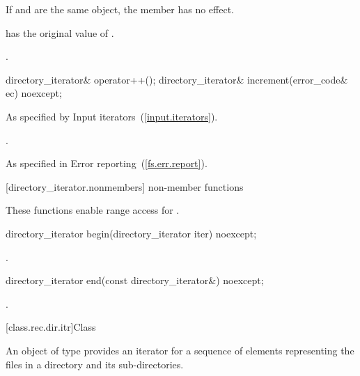 \begin{itemdescr}
\pnum
\effects If  and  are the same
  object, the member has no effect.

\pnum
\postconditions {} has the original value of .

\pnum
\returns {}.
\end{itemdescr}

\begin{itemdecl}
directory_iterator& operator++();
directory_iterator& increment(error_code& ec) noexcept;
\end{itemdecl}

\begin{itemdescr}

\pnum
\effects As specified by Input iterators~(\ref{input.iterators}).

\pnum
\returns {}.

\pnum
\throws As specified in Error reporting~(\ref{fs.err.report}).

\end{itemdescr}

[directory_iterator.nonmembers]{ non-member functions}

\pnum
These functions enable range access for .
\begin{itemdecl}
directory_iterator begin(directory_iterator iter) noexcept;
\end{itemdecl}

\begin{itemdescr}
\pnum
\returns {}.
\end{itemdescr}

\begin{itemdecl}
directory_iterator end(const directory_iterator&) noexcept;
\end{itemdecl}

\begin{itemdescr}
\pnum
\returns {}.
\end{itemdescr}

[class.rec.dir.itr]{Class }

\pnum
An object of type  provides an iterator for
a sequence of  elements representing the files in a
directory and its sub-directories.

